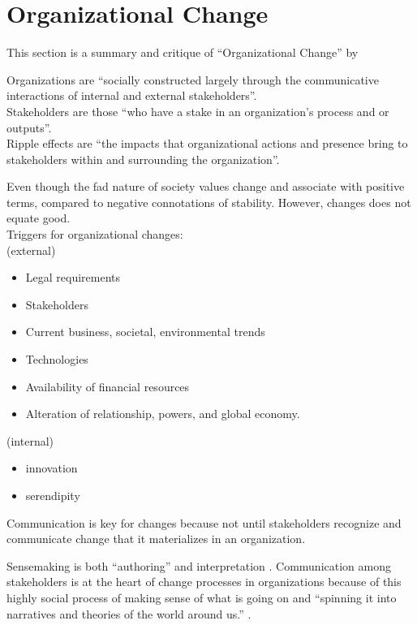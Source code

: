 \documentclass[
]{book}
\providecommand{\tightlist}{%
  \setlength{\itemsep}{0pt}\setlength{\parskip}{0pt}}
\begin{document}
\hypertarget{organizational-change}{%
\chapter{Organizational Change}\label{organizational-change}}

This section is a summary and critique of ``Organizational Change'' by \citep{Lewis_2019}

Organizations are ``socially constructed largely through the communicative interactions of internal and external
stakeholders''.\\
Stakeholders are those ``who have a stake in an organization's process and or outputs''.\\
Ripple effects are ``the impacts that organizational actions and presence bring to stakeholders within and surrounding
the organization''.

Even though the fad nature of society values change and associate with positive terms, compared to negative connotations
of stability. However, changes does not equate good.\\
Triggers for organizational changes:\\
(external)

\begin{itemize}
\tightlist
\item
  Legal requirements
\item
  Stakeholders
\item
  Current business, societal, environmental trends
\item
  Technologies
\item
  Availability of financial resources
\item
  Alteration of relationship, powers, and global economy.
\end{itemize}

(internal)

\begin{itemize}
\tightlist
\item
  innovation
\item
  serendipity
\end{itemize}

Communication is key for changes because not until stakeholders recognize and communicate change that it materializes in
an organization.

Sensemaking is both ``authoring'' and interpretation \citep{Lewis_2019}. Communication among stakeholders is at the heart of
change processes in organizations because of this highly social process of making sense of what is going on and
``spinning it into narratives and theories of the world around us.'' \citep{Lewis_2019}.
\end{document}
